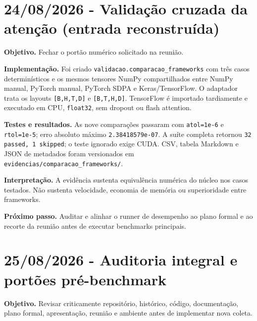 \section{24/08/2026 - Validação cruzada da atenção (entrada reconstruída)}



\textbf{Objetivo.} Fechar o portão numérico solicitado na reunião.







\textbf{Implementação.} Foi criado \texttt{validacao.\allowbreak{}comparacao\_\allowbreak{}frameworks} com três casos determinísticos e os mesmos tensores NumPy compartilhados entre NumPy manual, PyTorch manual, PyTorch SDPA e Keras/TensorFlow. O adaptador trata os layouts \texttt{[B,H,T,D]} e \texttt{[B,T,H,D]}. TensorFlow é importado tardiamente e executado em CPU, \texttt{float32}, sem dropout ou flash attention.






\textbf{Testes e resultados.} As nove comparações passaram com \texttt{atol=1e-6} e \texttt{rtol=1e-5}; erro absoluto máximo \texttt{2.\allowbreak{}38418579e-07}. A suíte completa retornou \texttt{32 passed, 1 skipped}; o teste ignorado exige CUDA. CSV, tabela Markdown e JSON de metadados foram versionados em \texttt{evidencias/\allowbreak{}comparacao\_\allowbreak{}frameworks/\allowbreak{}}.





\textbf{Interpretação.} A evidência sustenta equivalência numérica do núcleo nos casos testados. Não sustenta velocidade, economia de memória ou superioridade entre frameworks.




\textbf{Próximo passo.} Auditar e alinhar o runner de desempenho ao plano formal e ao recorte da reunião antes de executar benchmarks principais.



\section{25/08/2026 - Auditoria integral e portões pré-benchmark}




\textbf{Objetivo.} Revisar criticamente repositório, histórico, código, documentação, plano formal, apresentação, reunião e ambiente antes de implementar nova coleta.







